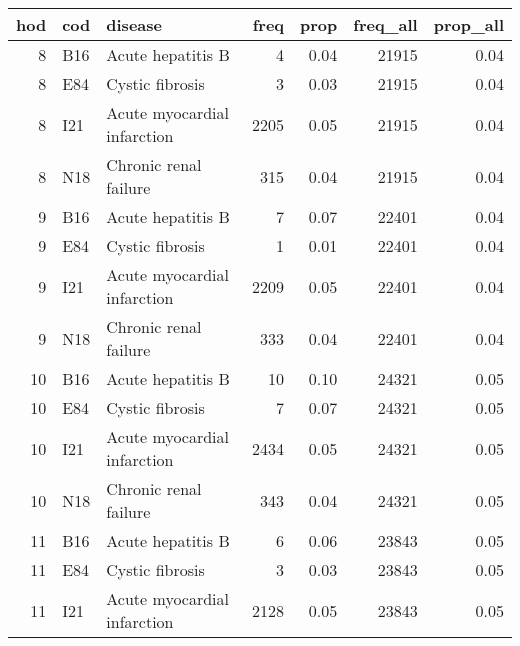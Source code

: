 \begin{tabular}{rllrrrr}
  \toprule
 hod & cod & disease & freq & prop & freq\_all & prop\_all \\ 
  \midrule
    8 & B16 & Acute hepatitis B &   4 & 0.04 & 21915 & 0.04 \\ 
    8 & E84 & Cystic fibrosis &   3 & 0.03 & 21915 & 0.04 \\ 
    8 & I21 & Acute myocardial infarction & 2205 & 0.05 & 21915 & 0.04 \\ 
    8 & N18 & Chronic renal failure & 315 & 0.04 & 21915 & 0.04 \\ 
    9 & B16 & Acute hepatitis B &   7 & 0.07 & 22401 & 0.04 \\ 
    9 & E84 & Cystic fibrosis &   1 & 0.01 & 22401 & 0.04 \\ 
    9 & I21 & Acute myocardial infarction & 2209 & 0.05 & 22401 & 0.04 \\ 
    9 & N18 & Chronic renal failure & 333 & 0.04 & 22401 & 0.04 \\ 
   10 & B16 & Acute hepatitis B &  10 & 0.10 & 24321 & 0.05 \\ 
   10 & E84 & Cystic fibrosis &   7 & 0.07 & 24321 & 0.05 \\ 
   10 & I21 & Acute myocardial infarction & 2434 & 0.05 & 24321 & 0.05 \\ 
   10 & N18 & Chronic renal failure & 343 & 0.04 & 24321 & 0.05 \\ 
   11 & B16 & Acute hepatitis B &   6 & 0.06 & 23843 & 0.05 \\ 
   11 & E84 & Cystic fibrosis &   3 & 0.03 & 23843 & 0.05 \\ 
   11 & I21 & Acute myocardial infarction & 2128 & 0.05 & 23843 & 0.05 \\ 
   \bottomrule
\end{tabular}
